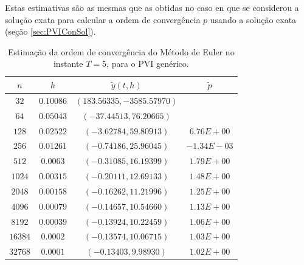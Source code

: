 \documentclass[twocolumn,amsmath,amssymb,floatfix]{revtex4}
\begin{document}
Estas estimativas são as mesmas que as obtidas no caso en que se considerou a solução exata para calcular a ordem de convergência $p$ usando a solução exata (seção \ref{sec:PVIConSol}).

\begin{table}[H]
 \centering
 \begin{tabular}{ c|c|c|c }
  \hline
  \hline
  $n$  & $h$  & $\tilde{y}(t,h)$ & $\tilde{p}$ \\
  \hline
  \hline
$32$&$0.10086$&	$  ( 183.56335, -3585.57970)$ &	$ $ \\
\hline
$64$&$0.05043$&$  ( -37.44513,   76.20665)$&$ $\\
\hline
$128$&$0.02522	 $&$  (  -3.62784,   59.80913)	$&$6.76E+00$\\
\hline
$256$&$0.01261	 $&$  (  -0.74186,   25.96045)	$&$-1.34E-03$\\
\hline
$512$&$0.0063	 $&$  (  -0.31085,   16.19399)	$&$1.79E+00$\\
\hline
$1024$&$0.00315	 $&$  (  -0.20111,   12.69133)	$&$1.48E+00$\\
\hline
$2048$&$0.00158	 $&$  (  -0.16262,   11.21996)	$&$1.25E+00$\\
\hline
$4096$&$0.00079	 $&$  (  -0.14657,   10.54660)	$&$1.13E+00$\\
\hline
$8192$&$0.00039	 $&$  (  -0.13924,   10.22459)	$&$1.06E+00$\\
\hline
$16384$&$0.0002	 $&$  (  -0.13574,   10.06715)	$&$1.03E+00$\\
\hline
$32768$&$0.0001	 $&$  (  -0.13403,    9.98930)	$&$1.02E+00$\\
  \hline
  \hline
 \end{tabular}
   \caption{Estimação da ordem de convergência do Método de Euler no instante $T=5$, para o PVI genérico.} \label{tab:c2m1t5}
\end{table}
\end{document}
